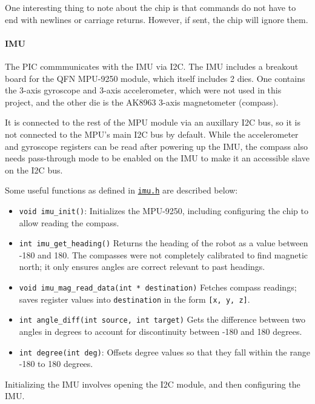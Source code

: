 \documentclass[]{article}
\providecommand{\tightlist}{%
  \setlength{\itemsep}{0pt}\setlength{\parskip}{0pt}}
\let\oldparagraph\paragraph
\renewcommand{\paragraph}[1]{\oldparagraph{#1}\mbox{}}
\begin{document}
One interesting thing to note about the chip is that commands do not
have to end with newlines or carriage returns. However, if sent, the
chip will ignore them.

\hypertarget{imu}{%
\paragraph{IMU}\label{imu}}

The PIC commmunicates with the IMU via I2C. The IMU includes a breakout
board for the QFN MPU-9250 module, which itself includes 2 dies. One
contains the 3-axis gyroscope and 3-axis accelerometer, which were not
used in this project, and the other die is the AK8963 3-axis
magnetometer (compass).

It is connected to the rest of the MPU module via an auxillary I2C bus,
so it is not connected to the MPU's main I2C bus by default. While the
accelerometer and gyroscope registers can be read after powering up the
IMU, the compass also needs pass-through mode to be enabled on the IMU
to make it an accessible slave on the I2C bus.

Some useful functions as defined in
\href{generated/imu.h.html}{\texttt{imu.h}} are described below:

\begin{itemize}
\tightlist
\item
  \texttt{void\ imu\_init()}: Initializes the MPU-9250, including
  configuring the chip to allow reading the compass.
\item
  \texttt{int\ imu\_get\_heading()} Returns the heading of the robot as
  a value between -180 and 180. The compasses were not completely
  calibrated to find magnetic north; it only ensures angles are correct
  relevant to past headings.
\item
  \texttt{void\ imu\_mag\_read\_data(int\ *\ destination)} Fetches
  compass readings; saves register values into \texttt{destination} in
  the form \texttt{{[}x,\ y,\ z{]}}.
\item
  \texttt{int\ angle\_diff(int\ source,\ int\ target)} Gets the
  difference between two angles in degrees to account for discontinuity
  between -180 and 180 degrees.
\item
  \texttt{int\ degree(int\ deg)}: Offsets degree values so that they
  fall within the range -180 to 180 degrees.
\end{itemize}

Initializing the IMU involves opening the I2C module, and then
configuring the IMU.
\end{document}
